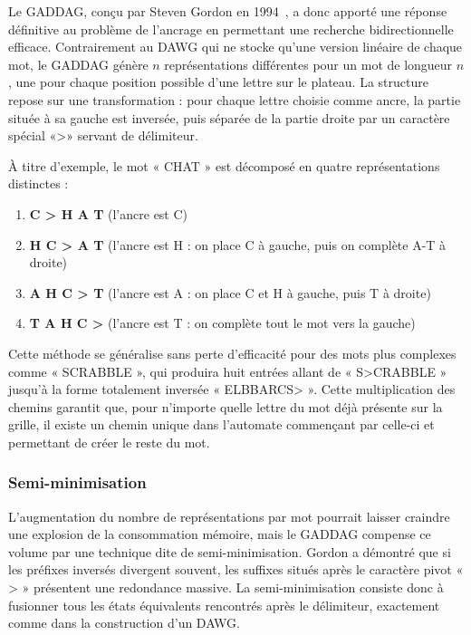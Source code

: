 \documentclass[a4paper]{article}
\begin{document}
Le GADDAG, conçu par Steven Gordon en 1994~\cite{10.1002/spe.4380240205}, a donc apporté une réponse définitive au problème de l'ancrage en permettant une recherche bidirectionnelle efficace. Contrairement
 au DAWG qui ne stocke qu'une version linéaire de chaque mot, le GADDAG génère $n$ représentations différentes pour un mot de longueur $n$, une pour chaque position possible
  d'une lettre sur le plateau. La structure repose sur une transformation : pour chaque lettre choisie comme ancre, la partie située à sa gauche est inversée, puis séparée
   de la partie droite par un caractère spécial «>» servant de délimiteur.\newline

À titre d'exemple, le mot « CHAT » est décomposé en quatre représentations distinctes :
\begin{enumerate}
    \item \textbf{C > H A T} \quad (l'ancre est C)
    \item \textbf{H C > A T} \quad (l'ancre est H : on place C à gauche, puis on complète A-T à droite)
    \item \textbf{A H C > T} \quad (l'ancre est A : on place C et H à gauche, puis T à droite)
    \item \textbf{T A H C >} \quad (l'ancre est T : on complète tout le mot vers la gauche)
\end{enumerate}

Cette méthode se généralise sans perte d'efficacité pour des mots plus complexes comme « SCRABBLE », qui produira huit entrées allant de « S>CRABBLE » jusqu'à 
la forme totalement inversée « ELBBARCS> ». Cette multiplication des chemins garantit que, pour n'importe quelle lettre du mot déjà présente sur la grille, il existe 
un chemin unique dans l'automate commençant par celle-ci et permettant de créer le reste du mot.\newline

\subsubsection{Semi-minimisation}

L'augmentation du nombre de représentations par mot pourrait laisser craindre une explosion de la consommation mémoire, mais le GADDAG compense ce volume par une technique 
dite de semi-minimisation. Gordon a démontré que si les préfixes inversés divergent souvent, les suffixes situés après le caractère pivot « > » présentent une redondance
massive. La semi-minimisation consiste donc à fusionner tous les états équivalents rencontrés après le délimiteur, exactement comme dans la construction d'un DAWG.\newline
\end{document}
